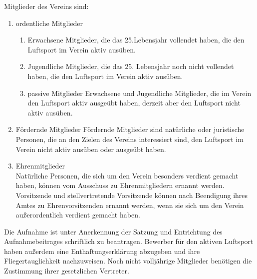 \documentclass[10pt,a4paper,parskip=half]{scrartcl}
\begin{document}
\begin{contract}
\begin{multicols}{2}
    \label{C:Mitglieder}
    
    Mitglieder des Vereins sind:
    \begin{enumerate}
      \item ordentliche Mitglieder
            
            \begin{enumerate}
              \item Erwachsene Mitglieder,
                    die das 25.Lebensjahr vollendet haben,
                    die den Luftsport im Verein aktiv
                    ausüben. \label{S:OrdentlicheMitglieder:Erwachsene}
              \item Jugendliche Mitglieder,
                    die das 25. Lebensjahr noch nicht vollendet haben,
                    die den Luftsport im Verein aktiv ausüben. \label{S:OrdentlicheMitglieder:Jugendliche}
              \item{passive Mitglieder} Erwachsene und Jugendliche Mitglieder,
                    die im Verein den Luftsport aktiv ausgeübt haben,
                    derzeit aber den Luftsport nicht aktiv ausüben.
            \end{enumerate}
      \item{Fördernde Mitglieder} Fördernde Mitglieder sind natürliche oder juristische Personen,
            die an den Zielen des Vereins interessiert sind,
            den Luftsport im Verein nicht aktiv ausüben oder ausgeübt haben.
            
            
      \item{Ehrenmitglieder}\\
            Natürliche Personen,
            die sich um den Verein besonders verdient gemacht haben,
            können vom Ausschuss zu Ehrenmitgliedern ernannt werden.
            Vorsitzende und stellvertretende Vorsitzende können nach Beendigung ihres Amtes zu Ehrenvorsitzenden ernannt werden,
            wenn sie sich um den Verein außerordentlich verdient gemacht haben.
    \end{enumerate}\label{S:OrdentlicheMitglieder}
    
    
    Die Aufnahme ist unter Anerkennung der Satzung und Entrichtung des Aufnahmebeitrages schriftlich zu beantragen.
    Bewerber für den aktiven Luftsport haben außerdem eine Enthaftungserklärung abzugeben und ihre Fliegertauglichkeit nachzuweisen.
    Noch nicht volljährige Mitglieder benötigen die Zustimmung ihrer gesetzlichen Vertreter.
    

\end{multicols}
\end{contract}
\end{document}
